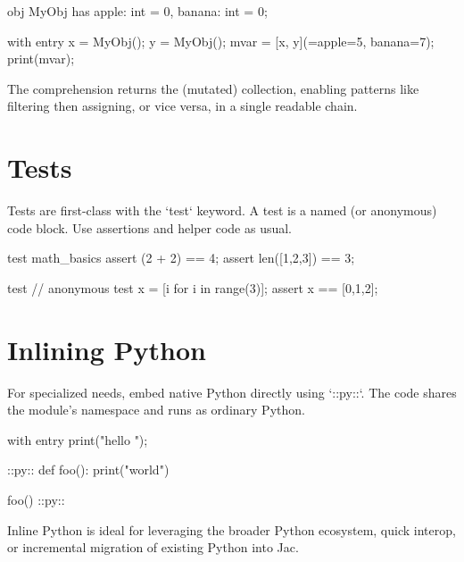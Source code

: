 \begin{jacblock}
obj MyObj {
    has apple: int = 0,
        banana: int = 0;
}

with entry {
    x = MyObj();
    y = MyObj();
    mvar = [x, y](=apple=5, banana=7);
    print(mvar);
}
\end{jacblock}

The comprehension returns the (mutated) collection, enabling patterns like filtering then assigning, or vice versa, in a single readable chain.

\section{Tests}

Tests are first-class with the `test` keyword. A test is a named (or anonymous) code block. Use assertions and helper code as usual.

\begin{jacblock}
test math_basics {
    assert (2 + 2) == 4;
    assert len([1,2,3]) == 3;
}

test {  // anonymous test
    x = [i for i in range(3)];
    assert x == [0,1,2];
}
\end{jacblock}

\section{Inlining Python}

For specialized needs, embed native Python directly using `::py::`. The code shares the module's namespace and runs as ordinary Python.

\begin{jacblock}
with entry {
    print("hello ");
}

::py::
def foo():
    print("world")

foo()
::py::
\end{jacblock}

Inline Python is ideal for leveraging the broader Python ecosystem, quick interop, or incremental migration of existing Python into Jac.